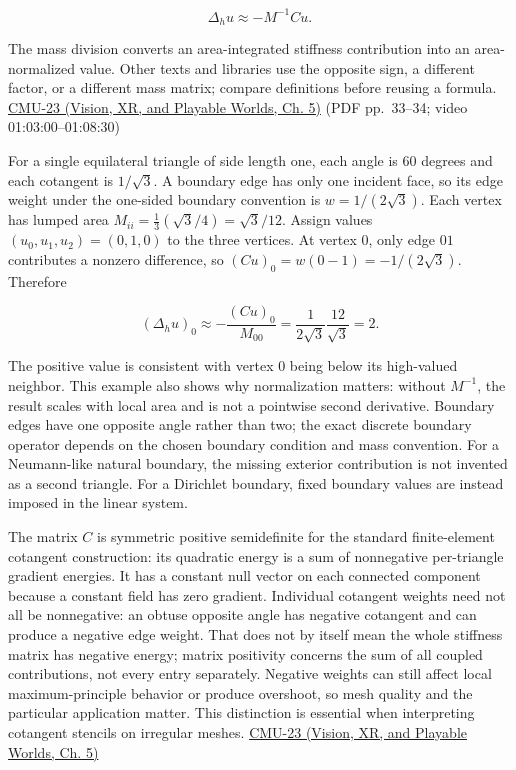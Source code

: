 \[
\Delta_hu\approx -M^{-1}Cu.
\]

The mass division converts an area-integrated stiffness contribution into an area-normalized value. Other texts and libraries use the opposite sign, a different factor, or a different mass matrix; compare definitions before reusing a formula. \href{../07-Vision-XR-and-Playable-Worlds/main.pdf\#nameddest=04-visual-computing-ii-ch036-cmu-23---physically-based-animation-and-pdes}{CMU-23 (Vision, XR, and Playable Worlds, Ch. 5)} (PDF pp.~33--34; video 01:03:00--01:08:30)

For a single equilateral triangle of side length one, each angle is \(60\) degrees and each cotangent is \(1/\sqrt{3}\). A boundary edge has only one incident face, so its edge weight under the one-sided boundary convention is \(w=1/(2\sqrt3)\). Each vertex has lumped area \(M_{ii}=\frac13(\sqrt3/4)=\sqrt3/12\). Assign values \((u_0,u_1,u_2)=(0,1,0)\) to the three vertices. At vertex 0, only edge \(01\) contributes a nonzero difference, so \((Cu)_0=w(0-1)=-1/(2\sqrt3)\). Therefore

\[
(\Delta_hu)_0\approx-\frac{(Cu)_0}{M_{00}}
=\frac{1}{2\sqrt3}\frac{12}{\sqrt3}=2.
\]

The positive value is consistent with vertex 0 being below its high-valued neighbor. This example also shows why normalization matters: without \(M^{-1}\), the result scales with local area and is not a pointwise second derivative. Boundary edges have one opposite angle rather than two; the exact discrete boundary operator depends on the chosen boundary condition and mass convention. For a Neumann-like natural boundary, the missing exterior contribution is not invented as a second triangle. For a Dirichlet boundary, fixed boundary values are instead imposed in the linear system.

The matrix \(C\) is symmetric positive semidefinite for the standard finite-element cotangent construction: its quadratic energy is a sum of nonnegative per-triangle gradient energies. It has a constant null vector on each connected component because a constant field has zero gradient. Individual cotangent weights need not all be nonnegative: an obtuse opposite angle has negative cotangent and can produce a negative edge weight. That does not by itself mean the whole stiffness matrix has negative energy; matrix positivity concerns the sum of all coupled contributions, not every entry separately. Negative weights can still affect local maximum-principle behavior or produce overshoot, so mesh quality and the particular application matter. This distinction is essential when interpreting cotangent stencils on irregular meshes. \href{../07-Vision-XR-and-Playable-Worlds/main.pdf\#nameddest=04-visual-computing-ii-ch036-cmu-23---physically-based-animation-and-pdes}{CMU-23 (Vision, XR, and Playable Worlds, Ch. 5)}

